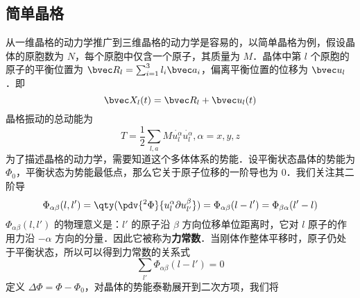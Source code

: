 
\subsection{简单晶格}
从一维晶格的动力学推广到三维晶格的动力学是容易的，以简单晶格为例，假设晶体的原胞数为 $N$，每个原胞中仅含一个原子，其质量为 $M$．晶体中第 $l$ 个原胞的原子的平衡位置为 $\bvec R_l=\sum_{i=1}^3 l_i\bvec a_i$，偏离平衡位置的位移为 $\bvec u_l$．即
\begin{equation}
\bvec X_l(t)=\bvec R_l+\bvec u_l(t)
\end{equation}
晶格振动的总动能为
\begin{equation}
T=\frac{1}{2}\sum_{l,a} M \dot{u_l^\alpha}\dot{u_l^\alpha},\alpha=x,y,z
\end{equation}
为了描述晶格的动力学，需要知道这个多体体系的势能．设平衡状态晶体的势能为 $\Phi_0$，平衡状态为势能最低点，那么它关于原子位移的一阶导也为 $0$．我们关注其二阶导
\begin{equation}
\Phi_{\alpha\beta}(l,l')=\qty(\pdv{^2\Phi}{u_l^\alpha\partial u_{l'}^\beta})=\Phi_{\alpha\beta}(l-l')=\Phi_{\beta\alpha}(l'-l)
\end{equation}
$\Phi_{\alpha\beta}(l,l')$ 的物理意义是：$l'$ 的原子沿 $\beta$ 方向位移单位距离时，它对 $l$ 原子的作用力沿 $-\alpha$ 方向的分量．因此它被称为\textbf{力常数}．当刚体作整体平移时，原子仍处于平衡状态，所以可以得到力常数的关系式
\begin{equation}
\sum_{l'}\Phi_{\alpha\beta}(l-l')=0
\end{equation}
定义 $\Delta \Phi=\Phi-\Phi_0$，对晶体的势能泰勒展开到二次方项，我们将